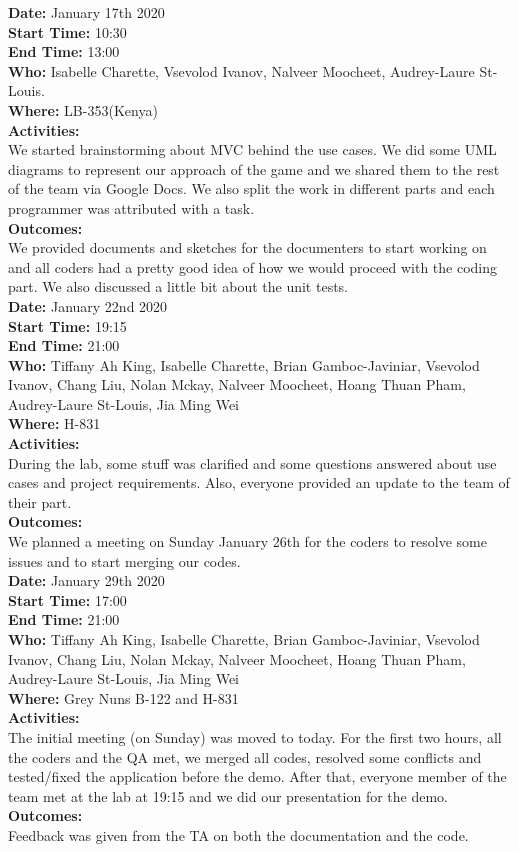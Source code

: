 \documentclass[12pt]{article}
\begin{document}
{\bf Date:} January 17th 2020 \\
{\bf Start Time:} 10:30 \\
{\bf End Time:} 13:00 \\
{\bf Who:} Isabelle Charette, Vsevolod Ivanov, Nalveer Moocheet, Audrey-Laure St-Louis. \\
{\bf Where:} LB-353(Kenya) \\
{\bf Activities:}\\
We started brainstorming about MVC behind the use cases. We did some UML diagrams to represent our approach of the game and we shared them to the rest of the team via Google Docs. We also split the work in different parts and each programmer was attributed with a task.\\
{\bf Outcomes:}\\
We provided documents and sketches for the documenters to start working on and all coders had a pretty good idea of how we would proceed with the coding part. We also discussed a little bit about the unit tests.\\

{\bf Date:} January 22nd 2020 \\
{\bf Start Time:} 19:15 \\
{\bf End Time:} 21:00 \\
{\bf Who:} Tiffany Ah King, Isabelle Charette, Brian Gamboc-Javiniar, Vsevolod Ivanov, Chang Liu, Nolan Mckay, Nalveer Moocheet, Hoang Thuan Pham, Audrey-Laure St-Louis, Jia Ming Wei \\
{\bf Where:} H-831 \\
{\bf Activities:}\\
During the lab, some stuff was clarified and some questions answered about use cases and project requirements. Also, everyone provided an update to the team of their part.\\
{\bf Outcomes:}\\
We planned a meeting on Sunday January 26th for the coders to resolve some issues and to start merging our codes.\\

{\bf Date:} January 29th 2020 \\
{\bf Start Time:} 17:00 \\
{\bf End Time:} 21:00 \\
{\bf Who:} Tiffany Ah King, Isabelle Charette, Brian Gamboc-Javiniar, Vsevolod Ivanov, Chang Liu, Nolan Mckay, Nalveer Moocheet, Hoang Thuan Pham, Audrey-Laure St-Louis, Jia Ming Wei\\
{\bf Where:} Grey Nuns B-122 and H-831 \\
{\bf Activities:}\\
The initial meeting (on Sunday) was moved to today. For the first two hours, all the coders and the QA met, we merged all codes, resolved some conflicts and tested/fixed the application before the demo. After that, everyone member of the team met at the lab at 19:15 and we did our presentation for the demo.\\
{\bf Outcomes:}\\
Feedback was given from the TA on both the documentation and the code.\\
\end{document}
